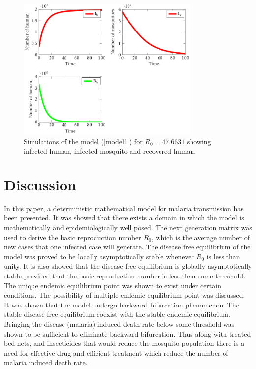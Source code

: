 \documentclass[review]{elsarticle}
\begin{document}
\begin{figure}[htb!]
\centering
\includegraphics[width=0.8\textwidth]{endemicsub}
\caption{Simulations of the model (\ref{model1}) for $R_0=47.6631$ showing infected human, infected mosquito and recovered human.  } \label{endemicsubplot}
\end{figure}

\section{Discussion}

In this paper, a deterministic mathematical model for malaria transmission has been presented. It was showed that there exists a domain in which the model is mathematically and epidemiologically well posed. The next generation matrix was used to derive the basic reproduction number $R_0$, which is the average number of new cases that one infected case will generate. The disease free equilibrium of the model was proved to be locally asymptotically stable whenever $R_0$ is less than unity. It is also showed that the disease free equilibrium is globally asymptotically stable provided that the basic reproduction number is less than some threshold. The unique endemic equilibrium point was shown to exist under certain conditions. The possibility of multiple endemic equilibrium point was discussed. It was shown that the model undergo backward bifurcation phenomenon. The stable disease free equilibrium coexist with the stable endemic equilibrium. Bringing the disease (malaria) induced death rate below some threshold was shown to be sufficient to eliminate backward bifurcation. Thus along with treated bed nets, and insecticides that would reduce the mosquito population there is a need for effective drug and efficient treatment which reduce the number of malaria induced death rate.

\newpage 


\end{document}
